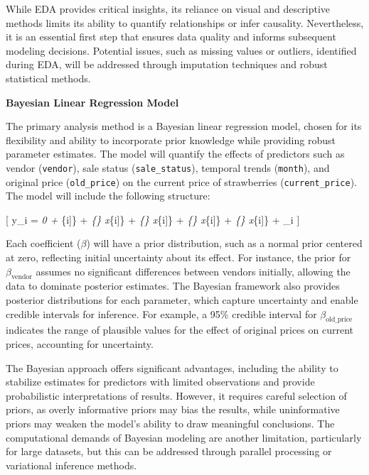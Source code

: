 \documentclass[
  letterpaper,
  DIV=11,
  numbers=noendperiod]{scrartcl}
\begin{document}
While EDA provides critical insights, its reliance on visual and
descriptive methods limits its ability to quantify relationships or
infer causality. Nevertheless, it is an essential first step that
ensures data quality and informs subsequent modeling decisions.
Potential issues, such as missing values or outliers, identified during
EDA, will be addressed through imputation techniques and robust
statistical methods.

\textbf{Bayesian Linear Regression Model}

The primary analysis method is a Bayesian linear regression model,
chosen for its flexibility and ability to incorporate prior knowledge
while providing robust parameter estimates. The model will quantify the
effects of predictors such as vendor (\texttt{vendor}), sale status
(\texttt{sale\_status}), temporal trends (\texttt{month}), and original
price (\texttt{old\_price}) on the current price of strawberries
(\texttt{current\_price}). The model will include the following
structure:

{[} y\_i = \beta\emph{0 + \beta}\{\text{vendor}{[}i{]}\} +
\beta\emph{\{\} \cdot x}\{\text{organic}{[}i{]}\} +
\beta\emph{\{\} \cdot x}\{\text{sale}{[}i{]}\} +
\beta\emph{\{\} \cdot x}\{\text{month}{[}i{]}\} +
\beta\emph{\{\} \cdot x}\{\text{old\_price}{[}i{]}\} +
\epsilon\_i {]}

Each coefficient (\(\beta\)) will have a prior distribution, such as a
normal prior centered at zero, reflecting initial uncertainty about its
effect. For instance, the prior for \(\beta_{\text{vendor}}\) assumes no
significant differences between vendors initially, allowing the data to
dominate posterior estimates. The Bayesian framework also provides
posterior distributions for each parameter, which capture uncertainty
and enable credible intervals for inference. For example, a 95\%
credible interval for \(\beta_{\text{old\_price}}\) indicates the range
of plausible values for the effect of original prices on current prices,
accounting for uncertainty.

The Bayesian approach offers significant advantages, including the
ability to stabilize estimates for predictors with limited observations
and provide probabilistic interpretations of results. However, it
requires careful selection of priors, as overly informative priors may
bias the results, while uninformative priors may weaken the model's
ability to draw meaningful conclusions. The computational demands of
Bayesian modeling are another limitation, particularly for large
datasets, but this can be addressed through parallel processing or
variational inference methods.
\end{document}
